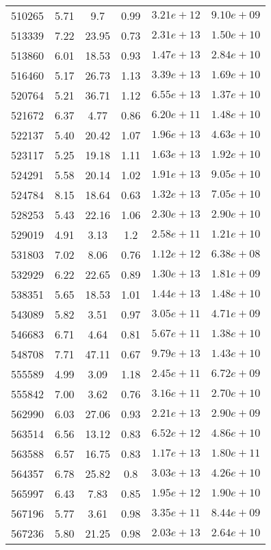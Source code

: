 \begin{table}
\begin{tabular}{cccccc}
510265 & 5.71 & 9.7 & 0.99 & $3.21e+12$ & $9.10e+09$ \\
513339 & 7.22 & 23.95 & 0.73 & $2.31e+13$ & $1.50e+10$ \\
513860 & 6.01 & 18.53 & 0.93 & $1.47e+13$ & $2.84e+10$ \\
516460 & 5.17 & 26.73 & 1.13 & $3.39e+13$ & $1.69e+10$ \\
520764 & 5.21 & 36.71 & 1.12 & $6.55e+13$ & $1.37e+10$ \\
521672 & 6.37 & 4.77 & 0.86 & $6.20e+11$ & $1.48e+10$ \\
522137 & 5.40 & 20.42 & 1.07 & $1.96e+13$ & $4.63e+10$ \\
523117 & 5.25 & 19.18 & 1.11 & $1.63e+13$ & $1.92e+10$ \\
524291 & 5.58 & 20.14 & 1.02 & $1.91e+13$ & $9.05e+10$ \\
524784 & 8.15 & 18.64 & 0.63 & $1.32e+13$ & $7.05e+10$ \\
528253 & 5.43 & 22.16 & 1.06 & $2.30e+13$ & $2.90e+10$ \\
529019 & 4.91 & 3.13 & 1.2 & $2.58e+11$ & $1.21e+10$ \\
531803 & 7.02 & 8.06 & 0.76 & $1.12e+12$ & $6.38e+08$ \\
532929 & 6.22 & 22.65 & 0.89 & $1.30e+13$ & $1.81e+09$ \\
538351 & 5.65 & 18.53 & 1.01 & $1.44e+13$ & $1.48e+10$ \\
543089 & 5.82 & 3.51 & 0.97 & $3.05e+11$ & $4.71e+09$ \\
546683 & 6.71 & 4.64 & 0.81 & $5.67e+11$ & $1.38e+10$ \\
548708 & 7.71 & 47.11 & 0.67 & $9.79e+13$ & $1.43e+10$ \\
555589 & 4.99 & 3.09 & 1.18 & $2.45e+11$ & $6.72e+09$ \\
555842 & 7.00 & 3.62 & 0.76 & $3.16e+11$ & $2.70e+10$ \\
562990 & 6.03 & 27.06 & 0.93 & $2.21e+13$ & $2.90e+09$ \\
563514 & 6.56 & 13.12 & 0.83 & $6.52e+12$ & $4.86e+10$ \\
563588 & 6.57 & 16.75 & 0.83 & $1.17e+13$ & $1.80e+11$ \\
564357 & 6.78 & 25.82 & 0.8 & $3.03e+13$ & $4.26e+10$ \\
565997 & 6.43 & 7.83 & 0.85 & $1.95e+12$ & $1.90e+10$ \\
567196 & 5.77 & 3.61 & 0.98 & $3.35e+11$ & $8.44e+09$ \\
567236 & 5.80 & 21.25 & 0.98 & $2.03e+13$ & $2.64e+10$ \\

\end{tabular}
\end{table}
